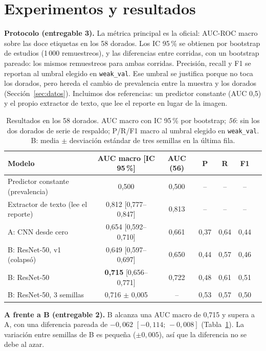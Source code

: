 \section{Experimentos y resultados}
\label{sec:resultados}

\textbf{Protocolo (entregable 3).} La métrica principal es la oficial: AUC-ROC macro sobre las
doce etiquetas en los 58 dorados. Los IC 95\,\% se obtienen por bootstrap de estudios (1\,000
remuestreos), y las diferencias entre corridas, con un bootstrap pareado: los mismos
remuestreos para ambas corridas. Precisión, recall y F1 se reportan al umbral elegido en
\texttt{weak\_val}. Ese umbral se justifica porque no toca los dorados, pero hereda el cambio
de prevalencia entre la muestra y los dorados (Sección~\ref{sec:datos}). Incluimos dos
referencias: un predictor constante (AUC 0,5) y el propio extractor de texto, que lee el
reporte en lugar de la imagen.

\begin{table}[t]
  \caption{Resultados en los 58 dorados. AUC macro con IC 95\,\% por bootstrap; \emph{56}:
    sin los dos dorados de serie de respaldo; P/R/F1 macro al umbral elegido en
    \texttt{weak\_val}. B: media $\pm$ desviación estándar de tres semillas en la última fila.}
  \label{tab:main}
  \centering
  \small
  \begin{tabular}{lcccccc}
    \toprule
    Modelo & AUC macro [IC 95\,\%] & AUC (56) & P & R & F1 \\
    \midrule
    Predictor constante (prevalencia)   & 0,500 & 0,500 & -- & -- & -- \\
    Extractor de texto (lee el reporte) & 0,812 [0,777--0,847] & 0,813 & -- & -- & -- \\
    \midrule
    A: CNN desde cero                   & 0,654 [0,592--0,710] & 0,661 & 0,37 & 0,64 & 0,44 \\
    B: ResNet-50, v1 (colapsó)          & 0,649 [0,597--0,697] & 0,650 & 0,44 & 0,57 & 0,46 \\
    B: ResNet-50                        & \textbf{0,715} [0,656--0,771] & 0,722 & 0,48 & 0,61 & 0,51 \\
    B: ResNet-50, 3 semillas            & 0,716 $\pm$ 0,005 & -- & 0,53 & 0,57 & 0,50 \\
    \bottomrule
  \end{tabular}
\end{table}

\textbf{A frente a B (entregable 2).} B alcanza una AUC macro de 0,715 y supera a A, con una
diferencia pareada de $-0{,}062$ $[-0{,}114;\,-0{,}008]$ (Tabla~\ref{tab:main}). La variación
entre semillas de B es pequeña ($\pm0{,}005$), así que la diferencia no se debe al azar.

